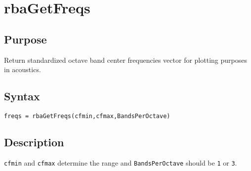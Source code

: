 
\chapter{rbaGetFreqs} %
\label{cha:rbaGetFreqs} %

\section{Purpose} %
\label{sec:rbaGetFreqs_purpose}
Return standardized octave band center frequencies vector for plotting purposes in acoustics.


\section{Syntax} %
\label{sec:rbaGetFreqs_syntax}


\texttt{freqs = rbaGetFreqs(cfmin,cfmax,BandsPerOctave)}




\section{Description} %
\label{sec:rbaGetFreqs_description}
\texttt{cfmin} and \texttt{cfmax} determine the range and \texttt{BandsPerOctave} should be \texttt{1} or \texttt{3}.




